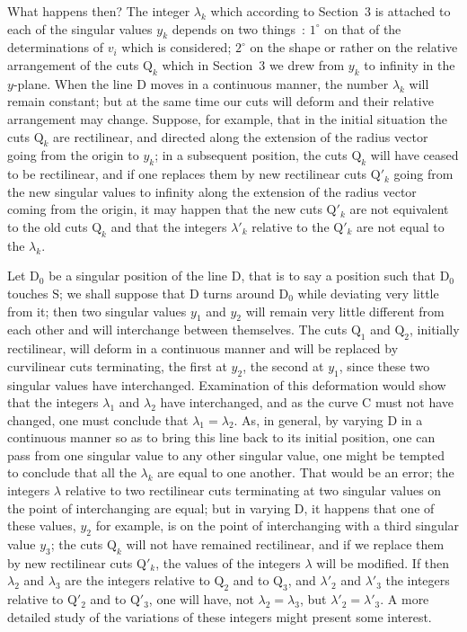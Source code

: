 \documentclass{article}
\begin{document}
What happens then? The integer $\lambda_{k}$ which according to Section~3 is attached to each of the singular values $y_{k}$ depends on two things~: $1^{\circ}$ on that of the determinations of $v_{i}$ which is considered; $2^{\circ}$ on the shape or rather on the relative arrangement of the cuts $\mathrm{Q}_{k}$ which in Section~3 we drew from $y_{k}$ to infinity in the $y$-plane. When the line $\mathrm{D}$ moves in a continuous manner, the number $\lambda_{k}$ will remain constant; but at the same time our cuts will deform and their relative arrangement may change. Suppose,
for example, that in the initial situation the cuts $\mathrm{Q}_{k}$ are rectilinear, and directed along the extension of the radius vector going from the origin to $y_{k}$; in a subsequent position, the cuts $\mathrm{Q}_{k}$ will have ceased to be rectilinear, and if one replaces them by new rectilinear cuts $\mathrm{Q}'_{k}$ going from the new singular values to infinity along the extension of the radius vector coming from the origin, it may happen that the new cuts $\mathrm{Q}'_{k}$ are not equivalent to the old cuts $\mathrm{Q}_{k}$ and that the integers $\lambda'_{k}$ relative to the $\mathrm{Q}'_{k}$ are not equal to the $\lambda_{k}$.

Let $\mathrm{D}_{0}$ be a singular position of the line $\mathrm{D}$, that is to say a position such that $\mathrm{D}_{0}$ touches $\mathrm{S}$; we shall suppose that $\mathrm{D}$ turns around $\mathrm{D}_{0}$ while deviating very little from it; then two singular values $y_{1}$ and $y_{2}$ will remain very little different from each other and will interchange between themselves. The cuts $\mathrm{Q}_{1}$ and $\mathrm{Q}_{2}$, initially rectilinear, will deform in a continuous manner and will be replaced by curvilinear cuts terminating, the first at $y_{2}$, the second at $y_{1}$, since these two singular values have interchanged. Examination of this deformation would show that the integers $\lambda_{1}$ and $\lambda_{2}$ have interchanged, and as the curve $\mathrm{C}$ must not have changed, one must conclude that $\lambda_{1} = \lambda_{2}$. As, in general, by varying $\mathrm{D}$ in a continuous manner so as to bring this line back to its initial position, one can pass from one singular value to any other singular value, one might be tempted to conclude that all the $\lambda_{k}$ are equal to one another. That would be an error; the integers $\lambda$ relative to two rectilinear cuts terminating at two singular values on the point of interchanging are equal; but in varying $\mathrm{D}$, it happens that one of these values, $y_{2}$ for example, is on the point of interchanging with a third singular value $y_{3}$; the cuts $\mathrm{Q}_{k}$ will not have remained rectilinear, and if we replace them by new rectilinear cuts $\mathrm{Q}'_{k}$, the values of the integers $\lambda$ will be modified. If then $\lambda_{2}$ and $\lambda_{3}$ are the integers relative to $\mathrm{Q}_{2}$ and to $\mathrm{Q}_{3}$, and $\lambda'_{2}$ and $\lambda'_{3}$ the integers relative to $\mathrm{Q}'_{2}$ and to $\mathrm{Q}'_{3}$, one will have, not $\lambda_{2} = \lambda_{3}$, but $\lambda'_{2} = \lambda'_{3}$. A more detailed study of the variations of these integers might present some interest.
\end{document}
